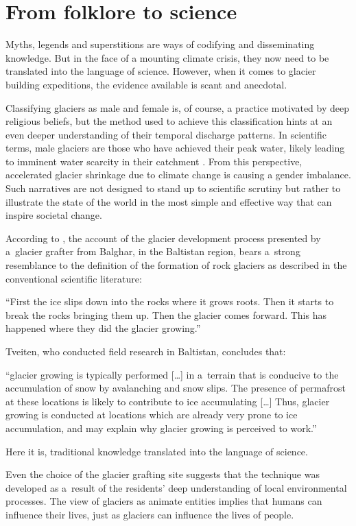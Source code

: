 \section{From folklore to science}

Myths, legends and superstitions are ways of codifying and disseminating knowledge. But in the face of a mounting climate crisis, they now need to be translated into the language of science. However, when it comes to glacier building expeditions, the evidence available is scant and anecdotal.

Classifying glaciers as male and female is, of course, a practice motivated by deep religious beliefs, but the method used to
achieve this classification hints at an even deeper understanding of their temporal discharge patterns. In
scientific terms, male glaciers are those who have achieved their peak water, likely leading to imminent
water scarcity in their catchment \citet{}. From this perspective, accelerated glacier shrinkage due to climate
change is causing a gender imbalance. Such narratives are not designed to stand up to scientific scrutiny but rather
to illustrate the state of the world in the most simple and effective way that can inspire societal change.

According to \citet{tveitenGlacierGrowingLocal2007}, the account of the glacier development process presented
by a glacier grafter from Balghar, in the Baltistan region, bears a strong resemblance to the definition of the formation of rock
glaciers as described in the conventional scientific literature: 

\begin{thesis_quotation}
“First the ice slips down into the rocks where it grows
roots. Then it starts to break the rocks bringing them up. Then the glacier comes forward. This has happened
where they did the glacier growing.” 
\end{thesis_quotation}

Tveiten, who conducted field research in Baltistan, concludes that: 

\begin{thesis_quotation}
“glacier growing is typically performed […] in a terrain that is conducive to the accumulation of snow by
avalanching and snow slips. The presence of permafrost at these locations is likely to contribute to ice
accumulating […] Thus, glacier growing is conducted at locations which are already very prone to ice
accumulation, and may explain why glacier growing is perceived to work.” 
\end{thesis_quotation}

Here it is, traditional knowledge translated into the language of science.

Even the choice of the glacier grafting site suggests that the technique was developed as a result of the residents' deep understanding of local environmental processes. The view of glaciers as animate entities implies that
humans can influence their lives, just as glaciers can influence the lives of people.

